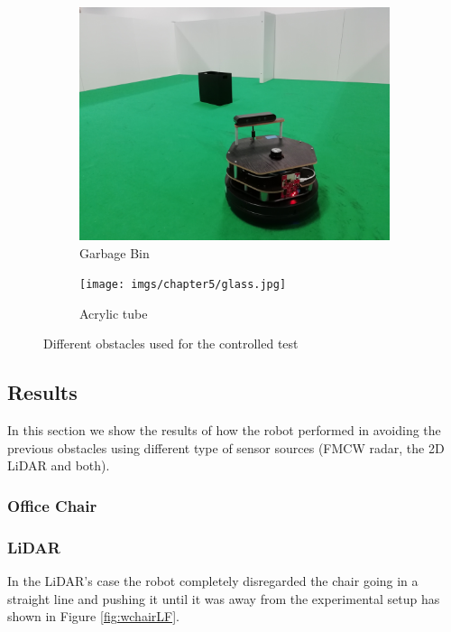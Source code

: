 \begin{figure}[h!]
\begin{subfigure}[b]{0.3\linewidth}
    \includegraphics[width=\linewidth]{imgs/chapter5/garbage.jpg}
    \caption{Garbage Bin}
    \label{fig::garbage}
  \end{subfigure}
  \begin{subfigure}[b]{0.3\linewidth}
    \texttt{[image: imgs/chapter5/glass.jpg]}
    \caption{Acrylic tube}
    \label{fig::tube}
  \end{subfigure}
  \caption{Different obstacles used for the controlled test}
  \label{fig:obstacles}
\end{figure}

\subsection{Results}
In this section we show the results of how the robot performed in avoiding the previous obstacles using different type of sensor sources (\ac{FMCW} radar, the 2D \ac{LiDAR} and both).

\subsubsection{Office Chair}







\subsubsection*{\ac{LiDAR}}
In the \ac{LiDAR}'s case  the robot completely disregarded the chair going in a straight line and pushing it until it was away from the experimental setup has shown in Figure \ref{fig:wchairLF}.

